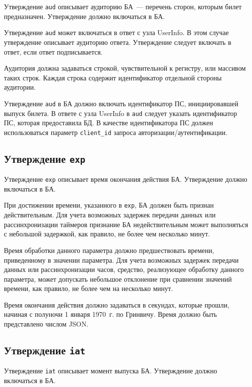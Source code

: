 Утверждение \lstinline{aud} описывает аудиторию БА~--- перечень сторон,
которым билет предназначен. Утверждение должно включаться в БА.

Утверждение \lstinline{aud} может включаться в ответ с узла UserInfo.
В этом случае утверждение описывает аудиторию ответа.
%
Утверждение следует включать в ответ, если ответ подписывается.

Аудитория должна задаваться строкой, чувствительной к регистру, 
или массивом таких строк. Каждая строка содержит идентификатор отдельной 
стороны аудитории.

Утверждение \lstinline{aud} в БА должно включать идентификатор ПС,
инициировавшей выпуск билета. 
%
В ответе с узла UserInfo в \lstinline{aud} следует указать идентификатор ПС, 
которая предоставила БД.
%
В качестве идентификатора ПС должен использоваться параметр 
\lstinline{client_id} запроса авторизации/аутентификации.

\subsection{Утверждение \lstinline{exp}}\label{CLAIMS.Exp}

Утверждение \lstinline{exp} описывает время окончания действия БА.
Утверждение должно включаться в БА.

При достижении времени, указанного в \lstinline{exp}, БА должен быть признан
действительным. Для учета возможных задержек передачи данных или
рассинхронизации таймеров признание БА недействительным может выполняться с
небольшой задержкой, как правило, не более чем несколько минут.

Время обработки данного параметра должно предшествовать времени, 
приведенному в значении параметра. Для учета возможных задержек передачи 
данных или рассинхронизации часов, средство, реализующее обработку данного 
параметра, может допускать небольшое отклонение при сравнении значений времени, 
как правило, не более чем на несколько минут.

Время окончания действия должно задаваться в секундах, которые прошли, начиная с
полуночи 1 января 1970~г. по Гринвичу. Время должно быть представлено числом
JSON.

\subsection{Утверждение \lstinline{iat}}\label{CLAIMS.Iat}

Утверждение \lstinline{iat} описывает момент выпуска БА.
Утверждение должно включаться в БА.

